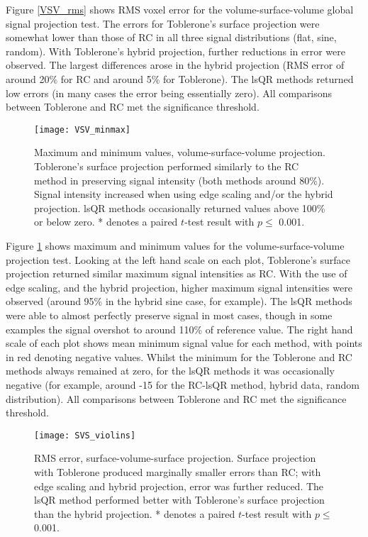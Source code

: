 Figure \ref{VSV_rms} shows RMS voxel error for the volume-surface-volume global signal projection test. The errors for Toblerone's surface projection were somewhat lower than those of RC in all three signal distributions (flat, sine, random). With Toblerone's hybrid projection, further reductions in error were observed. The largest differences arose in the hybrid projection (RMS error of around 20\% for RC and around 5\% for Toblerone). The lsQR methods returned low errors (in many cases the error being essentially zero). All comparisons  between Toblerone and RC met the significance threshold. 

\begin{figure}[H]
\centering
\texttt{[image: VSV\_minmax]}
\caption{Maximum and minimum values, volume-surface-volume projection. Toblerone's surface projection performed similarly to the RC method in preserving signal intensity (both methods around 80\%). Signal intensity increased when using edge scaling and/or the hybrid projection. lsQR methods occasionally returned values above 100\% or below zero. * denotes a paired $t$-test result with $p\leq $ 0.001.}
\label{VSV_minmax} 
\end{figure}

Figure \ref{VSV_minmax} shows maximum and minimum values for the volume-surface-volume projection test. Looking at the left hand scale on each plot, Toblerone's surface projection returned similar maximum signal intensities as RC. With the use of edge scaling, and the hybrid projection, higher maximum signal intensities were observed (around 95\% in the hybrid sine case, for example). The lsQR methods were able to almost perfectly preserve signal in most cases, though in some examples the signal overshot to around 110\% of reference value. The right hand scale of each plot shows mean minimum signal value for each method, with points in red denoting negative values. Whilst the minimum for the Toblerone and RC methods always remained at zero, for the lsQR methods it was occasionally negative (for example, around -15 for the RC-lsQR method, hybrid data, random distribution). All comparisons  between Toblerone and RC met the significance threshold. 

\begin{figure}[H]
\centering
\texttt{[image: SVS\_violins]}
\caption{RMS error, surface-volume-surface projection. Surface projection with Toblerone produced marginally smaller errors than RC; with edge scaling and hybrid projection, error was further reduced. The lsQR method performed better with Toblerone's surface projection than the hybrid projection. * denotes a paired $t$-test result with $p\leq $ 0.001.}
\label{SVS_rms} 
\end{figure}

